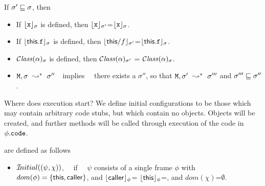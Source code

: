  
\begin{lemma}
If $\sigma'  \sqsubseteq \sigma$, then

\begin{itemize}
\item
If ${\lfloor{ {{\mbox{\tt{x}}}}}\rfloor_{\sigma}}$ is defined, then ${\lfloor{ {{\mbox{\tt{x}}}}}\rfloor_{\sigma'}}$=${\lfloor{ {{\mbox{\tt{x}}}}}\rfloor_{\sigma}}$.
\item
If ${\lfloor{ {{\bf{\sf {this}}}.{\mbox{\tt{f}}}}}\rfloor_{\sigma}}$ is defined, then ${\lfloor{ {{\bf{\sf {this}}}/f}}\rfloor_{\sigma'}}$=${\lfloor{ {{\bf{\sf {this}}}.{\mbox{\tt{f}}}}}\rfloor_{\sigma}}$.
\item
${\mathcal C}{\mathit{lass}}(\alpha)_{\sigma} $  is defined, then  ${\mathcal C}{\mathit{lass}}(\alpha)_{\sigma'} $  = ${\mathcal C}{\mathit{lass}}(\alpha)_{\sigma} $. 
\item
$\M, \sigma \ \leadsto^*\ \sigma''$\ \ implies    \ \ there exists a $\sigma''$, so that $\M, \sigma'\ \leadsto^*\ \sigma'''$
and $\sigma''' \sqsubseteq \sigma''$.
\end{itemize}
\end{lemma}



Where does execution start? We define initial configurations to be those which may contain arbitrary code stubs, but which contain no objects. Objects will be created, and further methods will be called through execution of the code in $\phi.{\mbox{\tt{code}}}$.

\begin{definition} are defined as follows \\

\begin{itemize}
     \item 
   ${{\mathcal I}\!nitial}((\psi,\chi))$, \ \ if \ \ $\psi$ consists of a single frame $\phi$ with $dom(\phi)=\{ {\bf{\sf {this}}}, {\bf{\sf {caller}}} \}$, and ${\lfloor{ {{\bf{\sf {caller}}}}}\rfloor_{\phi}}$= ${\lfloor{ {{\bf{\sf {this}}}}}\rfloor_{\phi}}$=\nullK, and $dom(\chi)$=$\emptyset$.
 \end{itemize}

\end{definition}

